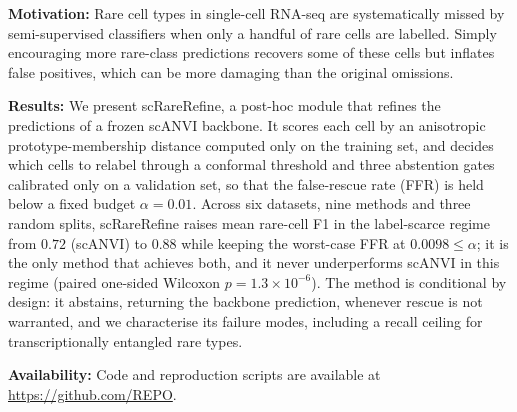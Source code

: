 \noindent\textbf{Motivation:} Rare cell types in single-cell RNA-seq are systematically missed by semi-supervised
classifiers when only a handful of rare cells are labelled. Simply encouraging more rare-class predictions
recovers some of these cells but inflates false positives, which can be more damaging than the original omissions.

\noindent\textbf{Results:} We present scRareRefine, a post-hoc module that refines the predictions of a frozen
scANVI backbone. It scores each cell by an anisotropic prototype-membership distance computed only on the training
set, and decides which cells to relabel through a conformal threshold and three abstention gates calibrated only on
a validation set, so that the false-rescue rate (FFR) is held below a fixed budget $\alpha=0.01$. Across six datasets,
nine methods and three random splits, scRareRefine raises mean rare-cell F1 in the label-scarce regime from
$0.72$ (scANVI) to $0.88$ while keeping the worst-case FFR at $0.0098\le\alpha$; it is the only method that achieves
both, and it never underperforms scANVI in this regime (paired one-sided Wilcoxon $p=1.3\times10^{-6}$). The method
is conditional by design: it abstains, returning the backbone prediction, whenever rescue is not warranted, and we
characterise its failure modes, including a recall ceiling for transcriptionally entangled rare types.

\noindent\textbf{Availability:} Code and reproduction scripts are available at \url{https://github.com/REPO}.
